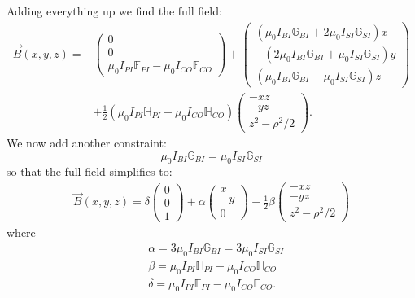 \documentclass{article}
\theoremstyle{definition}
\newcommand{\al}{\alpha}
\newcommand{\f}[2]{\frac{#1}{#2}}
\newcommand{\lp}{\left(}
\newcommand{\rp}{\right)}
\begin{document}
Adding everything up we find the full field:
\begin{align*}
\vec{B}(x,y,z) = 
&\begin{pmatrix}
0\\
0\\ 
\mu_0 I_{PI} \mathbb{F}_{PI} - \mu_0 I_{CO} \mathbb{F}_{CO} 
\end{pmatrix}
+ 
\begin{pmatrix}
(\mu_0 I_{BI}\mathbb{G}_{BI}  +2 \mu_0 I_{SI} \mathbb{G}_{SI}  )x\\
-(2\mu_0 I_{BI}\mathbb{G}_{BI} +\mu_0 I_{SI} \mathbb{G}_{SI})y\\
(\mu_0 I_{BI} \mathbb{G}_{BI} - \mu_0 I_{SI} \mathbb{G}_{SI})z
\end{pmatrix}\\
&+ \f{1}{2} \lp \mu_0 I_{PI}\mathbb{H}_{PI} -\mu_0 I_{CO}\mathbb{H}_{CO}  \rp \begin{pmatrix}
-xz\\-yz\\z^2 - \rho^2/2
\end{pmatrix}.
\end{align*}
We now add another constraint:
\begin{equation*}
\mu_0 I_{BI} \mathbb{G}_{BI} = \mu_0 I_{SI} \mathbb{G}_{SI}
\end{equation*}
so that the full field simplifies to:
\begin{align*}
\vec{B}(x,y,z) = 
\delta \begin{pmatrix}
0\\
0\\ 
1
\end{pmatrix}
+ 
\al \begin{pmatrix}
x\\
-y\\
0
\end{pmatrix}
+ \f{1}{2}\beta \begin{pmatrix}
-xz\\-yz\\z^2 - \rho^2/2
\end{pmatrix}
\end{align*}
where
\begin{align*}
&\al = 3\mu_0 I_{BI}\mathbb{G}_{BI} = 3\mu_0 I_{SI}\mathbb{G}_{SI}\\
&\beta = \mu_0 I_{PI}\mathbb{H}_{PI} -\mu_0 I_{CO}\mathbb{H}_{CO} \\
&\delta = \mu_0 I_{PI} \mathbb{F}_{PI} - \mu_0 I_{CO} \mathbb{F}_{CO} .
\end{align*}
\end{document}
